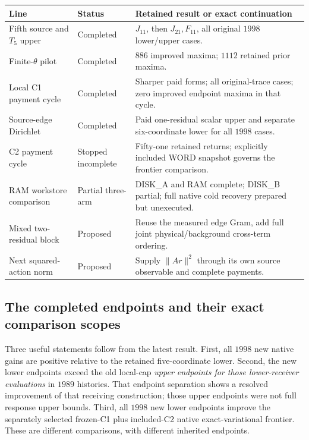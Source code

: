 \begin{table}[tbp]\centering\small
\begin{tabular}{>{\raggedright\arraybackslash}p{}>{\raggedright\arraybackslash}p{}>{\raggedright\arraybackslash}p{}}
\hline
Line&Status&Retained result or exact continuation\\
\hline
Fifth source and $T_5$ upper&Completed&$J_{11}$, then $J_{21},F_{11}$, all original $1998$ lower/upper cases.\\
Finite-$\theta$ pilot&Completed&$886$ improved maxima; $1112$ retained prior maxima.\\
Local C1 payment cycle&Completed&Sharper paid forms; all original-trace cases; zero improved endpoint maxima in that cycle.\\
Source-edge Dirichlet&Completed&Paid one-residual scalar upper and separate six-coordinate lower for all $1998$ cases.\\
C2 payment cycle&Stopped incomplete&Fifty-one retained returns; explicitly included WORD snapshot governs the frontier comparison.\\
RAM workstore comparison&Partial three-arm&DISK\_A and RAM complete; DISK\_B partial; full native cold recovery prepared but unexecuted.\\
Mixed two-residual block&Proposed&Reuse the measured edge Gram, add full joint physical/background cross-term ordering.\\
Next squared-action norm&Proposed&Supply $\|Ar\|^2$ through its own source observable and complete payments.\\
\hline
\end{tabular}
\vspace{-12pt}
\end{table}

\subsection{The completed endpoints and their exact comparison scopes}

Three useful statements follow from the latest result. First, all $1998$ new native gains are positive relative to the retained five-coordinate lower. Second, the new lower endpoints exceed the old local-cap \emph{upper endpoints for those lower-receiver evaluations} in $1989$ histories. That endpoint separation shows a resolved improvement of that receiving construction; those upper endpoints were not full response upper bounds. Third, all $1998$ new lower endpoints improve the separately selected frozen-C1 plus included-C2 native exact-variational frontier. These are different comparisons, with different inherited endpoints. 

